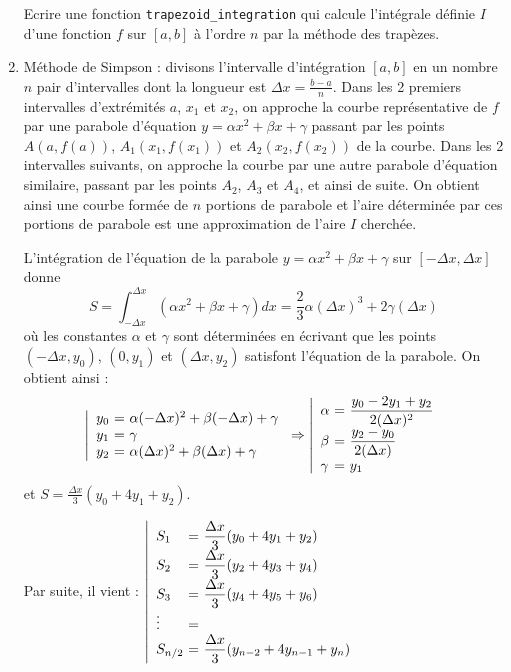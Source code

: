 \begin{td}
\begin{enumerate}
	Ecrire une fonction {\tt trapezoid\_integration} qui calcule l'intégrale définie $I$ d'une fonction 
	$f$ sur $[a,b]$ à l'ordre $n$ par la méthode des trapèzes.
	
\item Méthode de Simpson : divisons l'intervalle d'intégration $[a,b]$ en un nombre 
	$n$ pair d'intervalles dont la longueur est 
	$\displaystyle\Delta x = \frac{b-a}{n}$. 
	Dans les 2 premiers intervalles d'extrémités $a$, $x_1$ et $x_2$, on approche 
	la courbe représentative de $f$ par une parabole d'équation 
	$y = \alpha x^2 + \beta x + \gamma$ passant par les points $A(a,f(a))$, 
	$A_1(x_1,f(x_1))$ et $A_2(x_2,f(x_2))$ de la courbe. Dans les 2 intervalles 
	suivants, on approche la courbe par une autre parabole d'équation similaire, 
	passant par les points $A_2$, $A_3$ et $A_4$, et ainsi de suite.
	On obtient ainsi une courbe formée de $n$ portions de parabole et
	l'aire déterminée par ces portions de parabole est une approximation de l'aire $I$
	cherchée.
	
	L'intégration de l'équation de la parabole $y = \alpha x^2 + \beta x + \gamma$ sur
	$\displaystyle \left[-\Delta x,\Delta x\right]$ donne 
	$$S = \int_{-\Delta x}^{\Delta x} (\alpha x^2 + \beta x + \gamma)dx = 
	\frac{2}{3}\alpha(\Delta x)^3 + 2\gamma(\Delta x)$$
	où les constantes $\alpha$ et $\gamma$ sont déterminées en écrivant que les points
	$(-\Delta x,y_0)$, $(0,y_1)$ et $(\Delta x,y_2)$ satisfont l'équation de la parabole.
	On obtient ainsi :
	$$\left|\begin{array}{l@{\ =\ }l}
	y_0 & \alpha(-\Delta x)^2 + \beta(-\Delta x) + \gamma\\
	y_1 & \gamma\\
	y_2 & \alpha(\Delta x)^2 + \beta(\Delta x) + \gamma
	\end{array}\right.
	\Rightarrow
	\left|\begin{array}{l@{\ =\ }l}
	\alpha & \displaystyle \frac{y_0 - 2y_1 + y_2}{2(\Delta x)^2} \\
	\beta  & \displaystyle \frac{y_2-y_0}{2(\Delta x)}\\
	\gamma & \displaystyle y_1
	\end{array}\right.$$
	et $\displaystyle S = \frac{\Delta x}{3}(y_0+4y_1+y_2)$.
	
	Par suite, il vient :
	$\displaystyle\left|\begin{array}{l@{\ =\ }l}
	S_1     & \displaystyle \frac{\Delta x}{3}(y_0 + 4y_1 + y_2)\\
	S_2     & \displaystyle \frac{\Delta x}{3}(y_2 + 4y_3 + y_4)\\
	S_3     & \displaystyle \frac{\Delta x}{3}(y_4 + 4y_5 + y_6)\\
	\vdots  \\
	\displaystyle S_{n/2} & \displaystyle \frac{\Delta x}{3}(y_{n-2} + 4y_{n-1} + y_n)
	\end{array}\right.$ 
	

\end{enumerate}
\end{td}
